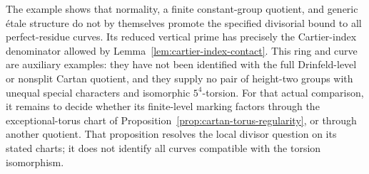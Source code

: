 The example shows that normality, a finite constant-group quotient,
and generic \'etale structure do not by themselves
promote the specified divisorial bound to all perfect-residue curves.
Its reduced vertical prime has precisely the Cartier-index denominator
allowed by Lemma~\ref{lem:cartier-index-contact}.
This ring and curve are auxiliary examples: they have not been identified
with the full Drinfeld-level or nonsplit Cartan quotient, and they supply
no pair of height-two groups with unequal special characters and
isomorphic $5^4$-torsion.
For that actual comparison, it remains to decide whether its finite-level
marking factors through the exceptional-torus chart of
Proposition~\ref{prop:cartan-torus-regularity}, or through another quotient.
That proposition resolves the local divisor question on its stated charts;
it does not identify all curves compatible with the torsion isomorphism.
